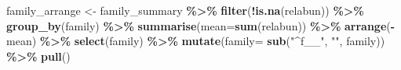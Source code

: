 \documentclass[
]{book}
\newenvironment{Shaded}{\begin{snugshade}}{\end{snugshade}}
\newcommand{\AttributeTok}[1]{\textcolor[rgb]{0.13,0.29,0.53}{#1}}
\newcommand{\FunctionTok}[1]{\textcolor[rgb]{0.13,0.29,0.53}{\textbf{#1}}}
\newcommand{\NormalTok}[1]{#1}
\newcommand{\OtherTok}[1]{\textcolor[rgb]{0.56,0.35,0.01}{#1}}
\newcommand{\SpecialCharTok}[1]{\textcolor[rgb]{0.81,0.36,0.00}{\textbf{#1}}}
\newcommand{\StringTok}[1]{\textcolor[rgb]{0.31,0.60,0.02}{#1}}
\begin{document}
\begin{Shaded}
\begin{Highlighting}[]
\NormalTok{family\_arrange }\OtherTok{\textless{}{-}}\NormalTok{ family\_summary }\SpecialCharTok{\%\textgreater{}\%}
    \FunctionTok{filter}\NormalTok{(}\SpecialCharTok{!}\FunctionTok{is.na}\NormalTok{(relabun)) }\SpecialCharTok{\%\textgreater{}\%}
    \FunctionTok{group\_by}\NormalTok{(family) }\SpecialCharTok{\%\textgreater{}\%}
    \FunctionTok{summarise}\NormalTok{(}\AttributeTok{mean=}\FunctionTok{sum}\NormalTok{(relabun)) }\SpecialCharTok{\%\textgreater{}\%}
    \FunctionTok{arrange}\NormalTok{(}\SpecialCharTok{{-}}\NormalTok{mean) }\SpecialCharTok{\%\textgreater{}\%}
    \FunctionTok{select}\NormalTok{(family) }\SpecialCharTok{\%\textgreater{}\%}
    \FunctionTok{mutate}\NormalTok{(}\AttributeTok{family=} \FunctionTok{sub}\NormalTok{(}\StringTok{"\^{}f\_\_"}\NormalTok{, }\StringTok{""}\NormalTok{, family)) }\SpecialCharTok{\%\textgreater{}\%}
    \FunctionTok{pull}\NormalTok{()}


\end{Highlighting}
\end{Shaded}
\end{document}
